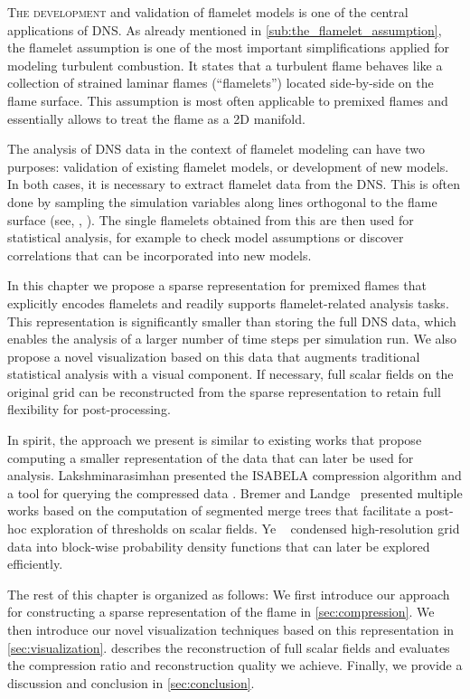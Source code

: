\vspace{-2\baselineskip}\lettrine[loversize=0.02, lhang=0.03,
findent=-0.7pt]{T}{he development} and validation of flamelet models is one of
the central applications of \ac{DNS}.
%
As already mentioned in \cref{sub:the_flamelet_assumption}, the flamelet
assumption is one of the most important simplifications applied for modeling
turbulent combustion.
%
It states that a turbulent flame behaves like a collection of strained laminar
flames (``flamelets'') located side-by-side on the flame surface.
%
This assumption is most often applicable to premixed flames and essentially
allows to treat the flame as a \ac{2D} manifold.
%

%
The analysis of \ac{DNS} data in the context of flamelet modeling can have
two purposes: validation of existing flamelet models, or development of new
models.
%
In both cases, it is necessary to extract flamelet data from the \ac{DNS}.
%
This is often done by sampling the simulation variables along lines orthogonal
to the flame surface (see, \eg, \cite{Zistl2009}).
%
The single flamelets obtained from this are then used for statistical analysis,
for example to check model assumptions or discover correlations that can be
incorporated into new models.
%

%
In this chapter we propose a sparse representation for premixed flames that
explicitly encodes flamelets and readily supports flamelet-related analysis
tasks.
%
This representation is significantly smaller than storing the full DNS data,
which enables the analysis of a larger number of time steps per simulation run.
%
We also propose a novel visualization based on this data that augments
traditional statistical analysis with a visual component.
%
If necessary, full scalar fields on the original grid can be reconstructed
from the sparse representation to retain full flexibility for post-processing.
%

%
In spirit, the approach we present is similar to existing works that propose
computing a smaller representation of the data that can later be used for
analysis.
%
Lakshminarasimhan \etal{} presented the ISABELA compression algorithm
\cite{Lakshminarasimhan2011} and a tool for querying the compressed data
\cite{Lakshminarasimhan2011a}.
%
Bremer and Landge~\cite{Bremer2009,Bremer2011,Bremer2010,Landge2014} presented
multiple works based on the computation of segmented merge trees that facilitate
a post-hoc exploration of thresholds on scalar fields.
%
Ye \etal{}~\cite{Ye2016} condensed high-resolution grid data into block-wise
probability density functions that can later be explored efficiently.
%

%
The rest of this chapter is organized as follows:
%
We first introduce our approach for constructing a sparse representation of the
flame in \cref{sec:compression}.
%
We then introduce our novel visualization techniques based on this
representation in \cref{sec:visualization}.
%
 describes the reconstruction of full scalar fields and
evaluates the compression ratio and reconstruction quality we achieve.
%
Finally, we provide a discussion and conclusion in \cref{sec:conclusion}.
%